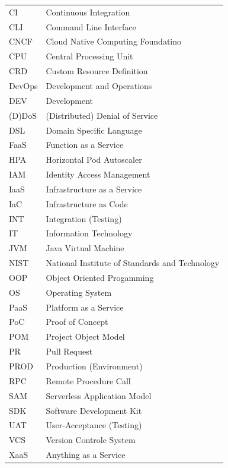 \documentclass[a4paper,twoside,11pt, pagesize]{scrartcl}
\begin{document}
\begin{spacing}{1.2}
\begin{spacing}{1.07}
\begin{tabular}{ p{2cm} p{10cm}}
  CI & Continuous Integration \\
  CLI & Command Line Interface \\
  CNCF & Cloud Native Computing Foundatino \\
  CPU & Central Processing Unit \\
  CRD & Custom Resource Definition \\
  DevOps & Development and Operations \\
  DEV & Development \\
  (D)DoS & (Distributed) Denial of Service \\
  DSL & Domain Specific Language \\
  FaaS & Function as a Service \\
  HPA & Horizontal Pod Autoscaler \\
  IAM & Identity Access Management \\
  IaaS & Infrastructure as a Service \\
  IaC & Infrastructure as Code \\
  INT & Integration (Testing) \\
  IT & Information Technology \\
  JVM & Java Virtual Machine \\
  NIST & National Institute of Standards and Technology \\
  OOP & Object Oriented Progamming \\
  OS & Operating System \\
  PaaS & Platform as a Service \\
  PoC & Proof of Concept \\
  POM & Project Object Model \\
  PR & Pull Request \\
  PROD & Production (Environment) \\
  RPC & Remote Procedure Call \\
  SAM & Serverless Application Model \\
  SDK & Software Development Kit \\
  UAT & User-Acceptance (Testing) \\
  VCS & Version Controle System \\
  XaaS & Anything as a Service \\

\end{tabular}
\end{spacing}
\newpage
\begin{spacing}{1.2}
\tableofcontents
\end{spacing}
\newpage

\end{spacing}
\end{document}

